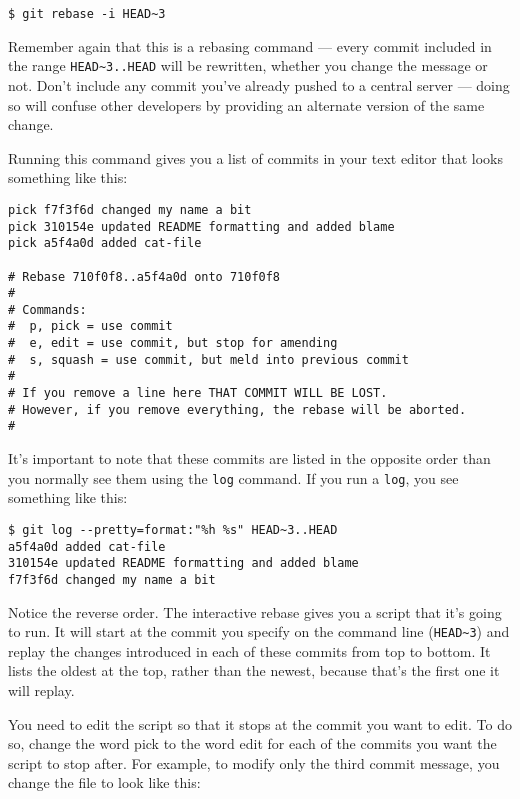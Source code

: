 \documentclass[a4paper]{book}
\begin{document}
\begin{shaded}\begin{verbatim}
$ git rebase -i HEAD~3
\end{verbatim}\end{shaded}

Remember again that this is a rebasing command --- every commit included in the range \texttt{HEAD\textasciitilde{}3..HEAD} will be rewritten, whether you change the message or not. Don't include any commit you've already pushed to a central server --- doing so will confuse other developers by providing an alternate version of the same change.

Running this command gives you a list of commits in your text editor that looks something like this:

\begin{shaded}\begin{verbatim}
pick f7f3f6d changed my name a bit
pick 310154e updated README formatting and added blame
pick a5f4a0d added cat-file

# Rebase 710f0f8..a5f4a0d onto 710f0f8
#
# Commands:
#  p, pick = use commit
#  e, edit = use commit, but stop for amending
#  s, squash = use commit, but meld into previous commit
#
# If you remove a line here THAT COMMIT WILL BE LOST.
# However, if you remove everything, the rebase will be aborted.
#
\end{verbatim}\end{shaded}

It's important to note that these commits are listed in the opposite order than you normally see them using the \texttt{log} command. If you run a \texttt{log}, you see something like this:

\begin{shaded}\begin{verbatim}
$ git log --pretty=format:"%h %s" HEAD~3..HEAD
a5f4a0d added cat-file
310154e updated README formatting and added blame
f7f3f6d changed my name a bit
\end{verbatim}\end{shaded}

Notice the reverse order. The interactive rebase gives you a script that it's going to run. It will start at the commit you specify on the command line (\texttt{HEAD\textasciitilde{}3}) and replay the changes introduced in each of these commits from top to bottom. It lists the oldest at the top, rather than the newest, because that's the first one it will replay.

You need to edit the script so that it stops at the commit you want to edit. To do so, change the word pick to the word edit for each of the commits you want the script to stop after. For example, to modify only the third commit message, you change the file to look like this:
\end{document}
